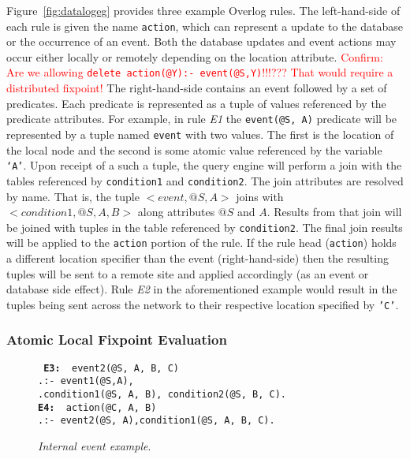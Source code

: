 \documentclass{vldb}
\newcommand{\datalogspace}{\textcolor[gray]{1}{.}\hspace{0.5in}}
\begin{document}
Figure~\ref{fig:datalogeg} provides three example Overlog rules.
The left-hand-side of each rule is given the name {\tt action},
which can represent a update to the database or the occurrence of an event.
Both the database updates and event actions may occur either locally or 
remotely depending on the location attribute.
\textcolor{red}{Confirm: Are we allowing {\tt delete action(@Y):- event(@S,Y)}!!!??? 
That would require a distributed fixpoint!}
The right-hand-side contains an event followed by a set of predicates.
Each predicate is represented as a tuple of values referenced by the
predicate attributes. 
For example, in rule {\em E1} the {\tt event(@S, A)}
predicate will be represented by a tuple named {\tt event} with two values. 
The first is the location of the local node and the second is some atomic value 
referenced by the variable {\tt `A'}. 
Upon receipt of a such a tuple, the query engine will perform a join with 
the tables referenced by {\tt condition1} and {\tt condition2}. 
The join attributes are resolved by name. 
That is, the tuple $<event, @S, A>$ joins with $<condition1, @S, A, B>$    
along attributes $@S$ and $A$.  
Results from that join will be joined with tuples in the table referenced 
by {\tt condition2}.
The final join results will be applied to the {\tt action} portion of the rule.
If the rule head ({\tt action}) holds a different location specifier than the event
(right-hand-side) then the resulting tuples will be sent to a remote site and applied
accordingly (as an event or database side effect). 
Rule {\em E2} in the aforementioned example would result in the tuples being sent across
the network to their respective location specified by {\tt 'C'}.

\subsubsection{Atomic Local Fixpoint Evaluation}

\begin{figure}[h]
\centering
\begin{boxedminipage}{3.2in}
\small{\tt
{\bf E3: } event2(@S, A, B, C) \\
\datalogspace :- event1(@S,A), \\
\datalogspace condition1(@S, A, B), condition2(@S, B, C). \\
{\bf E4: } action(@C, A, B)  \\
\datalogspace :- event2(@S, A),condition1(@S, A, B, C).
}
\small{\caption{\label{fig:datalogeg2}\emph{\small Internal event example}.}}
\end{boxedminipage}
\end{figure}
\end{document}
